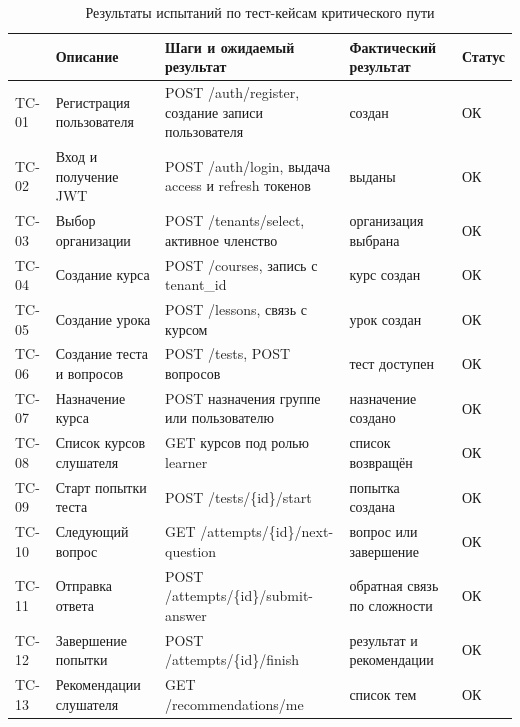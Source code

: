 \begin{table}[H]
\centering
\caption{Результаты испытаний по тест-кейсам критического пути}
\label{tab:appb-tests}
{\fontsize{11pt}{13pt}\selectfont
\setlength{\tabcolsep}{4pt}
\renewcommand{\arraystretch}{1.15}
\begin{tabularx}{\textwidth}{|>{\centering\arraybackslash}p{10mm}|>{\RaggedRight\arraybackslash}p{34mm}|>{\RaggedRight\arraybackslash}X|>{\RaggedRight\arraybackslash}p{26mm}|>{\centering\arraybackslash}p{18mm}|}
\hline
{\centering\arraybackslash\textbf{ID}} & {\centering\arraybackslash\textbf{Описание}} & {\centering\arraybackslash\textbf{Шаги и ожидаемый результат}} & {\centering\arraybackslash\textbf{Фактический результат}} & {\centering\arraybackslash\textbf{Статус}} \\
\hline
TC-01 & Регистрация пользователя & POST /auth/register, создание записи пользователя & создан & ОК \\
\hline
TC-02 & Вход и получение JWT & POST /auth/login, выдача access и refresh токенов & выданы & ОК \\
\hline
TC-03 & Выбор организации & POST /tenants/select, активное членство & организация выбрана & ОК \\
\hline
TC-04 & Создание курса & POST /courses, запись с tenant\_id & курс создан & ОК \\
\hline
TC-05 & Создание урока & POST /lessons, связь с курсом & урок создан & ОК \\
\hline
TC-06 & Создание теста и вопросов & POST /tests, POST вопросов & тест доступен & ОК \\
\hline
TC-07 & Назначение курса & POST назначения группе или пользователю & назначение создано & ОК \\
\hline
TC-08 & Список курсов слушателя & GET курсов под ролью learner & список возвращён & ОК \\
\hline
TC-09 & Старт попытки теста & POST /tests/\{id\}/start & попытка создана & ОК \\
\hline
TC-10 & Следующий вопрос & GET /attempts/\{id\}/next-question & вопрос или завершение & ОК \\
\hline
TC-11 & Отправка ответа & POST /attempts/\{id\}/submit-answer & обратная связь по сложности & ОК \\
\hline
TC-12 & Завершение попытки & POST /attempts/\{id\}/finish & результат и рекомендации & ОК \\
\hline
TC-13 & Рекомендации слушателя & GET /recommendations/me & список тем & ОК \\

\end{tabularx}}
\end{table}
